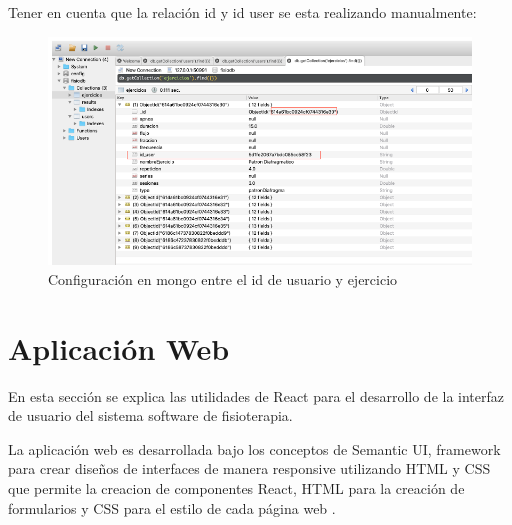 \documentclass[12pt]{article}
\begin{document}
\begin{enumerate}
            Tener en cuenta que la relación id y id user se esta realizando manualmente:
            \begin{figure}[ht]
            \centering
            \includegraphics[scale=0.4]{imag/realcionmongoonline.png}
            \caption{Configuración en mongo entre el id de usuario y ejercicio }
            \label{6}
            \end{figure}
            \FloatBarrier
            
            
    
    
\end{enumerate}





















\newpage
\section{Aplicación Web}

En esta sección se explica las utilidades de React para el desarrollo de la interfaz de usuario del sistema software de fisioterapia.

La aplicación web es desarrollada bajo los conceptos de Semantic UI, framework para crear diseños de interfaces de manera responsive utilizando HTML y CSS que permite la creacion de componentes React, HTML para la creación de formularios y CSS para el estilo de cada página web \cite{33}.
\end{document}
